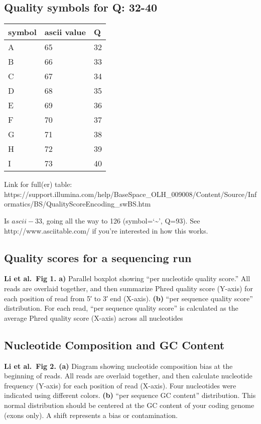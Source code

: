 \documentclass[11pt]{article}
\begin{document}
\hypertarget{quality-symbols-for-q-32-40}{%
\subsection{Quality symbols for Q:
32-40}\label{quality-symbols-for-q-32-40}}

\begin{longtable}[]{@{}lll@{}}
\toprule
symbol & ascii value & Q\tabularnewline
\midrule
\endhead
A & 65 & 32\tabularnewline
B & 66 & 33\tabularnewline
C & 67 & 34\tabularnewline
D & 68 & 35\tabularnewline
E & 69 & 36\tabularnewline
F & 70 & 37\tabularnewline
G & 71 & 38\tabularnewline
H & 72 & 39\tabularnewline
I & 73 & 40\tabularnewline
\bottomrule
\end{longtable}

Link for full(er) table:
https://support.illumina.com/help/BaseSpace\_OLH\_009008/Content/Source/Informatics/BS/QualityScoreEncoding\_swBS.htm

Is \(ascii -33\), going all the way to 126 (symbol=`\textasciitilde{}',
Q=93). See http://www.asciitable.com/ if you're interested in how this
works.

\hypertarget{quality-scores-for-a-sequencing-run}{%
\subsection{Quality scores for a sequencing
run}\label{quality-scores-for-a-sequencing-run}}

\textbf{Li et al.~Fig 1. a)} Parallel boxplot showing ``per nucleotide
quality score.'' All reads are overlaid together, and then summarize
Phred quality score (Y-axis) for each position of read from 5′ to 3′ end
(X-axis). \textbf{(b)} ``per sequence quality score'' distribution. For
each read, ``per sequence quality score'' is calculated as the average
Phred quality score (X-axis) across all nucleotides

\hypertarget{nucleotide-composition-and-gc-content}{%
\subsection{Nucleotide Composition and GC
Content}\label{nucleotide-composition-and-gc-content}}

\textbf{Li et al.~Fig 2. (a)} Diagram showing nucleotide composition
bias at the beginning of reads. All reads are overlaid together, and
then calculate nucleotide frequency (Y-axis) for each position of read
(X-axis). Four nucleotides were indicated using different colors.
\textbf{(b)} ``per sequence GC content'' distribution. This normal
distribution should be centered at the GC content of your coding genome
(exons only). A shift represents a bias or contamination.
\end{document}
